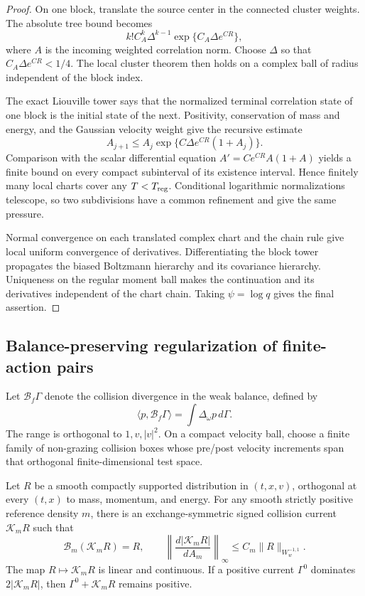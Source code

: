 \begin{proof}
On one block, translate the source center in the connected cluster weights.
The absolute tree bound becomes
\[
 k!C_A^k\Delta^{k-1}
 \exp\{C_A\Delta e^{CR}\},
\]
where \(A\) is the incoming weighted correlation norm.  Choose
\(\Delta\) so that \(C_A\Delta e^{CR}<1/4\).  The local cluster theorem then
holds on a complex ball of radius independent of the block index.

The exact Liouville tower says that the normalized terminal correlation state
of one block is the initial state of the next.  Positivity, conservation of
mass and energy, and the Gaussian velocity weight give the recursive estimate
\[
 A_{j+1}\le A_j\exp\{C\Delta e^{CR}(1+A_j)\}.
\]
Comparison with the scalar differential equation
\(A'=Ce^{CR}A(1+A)\) yields a finite bound on every compact subinterval of its
existence interval.  Hence finitely many local charts cover any
\(T<T_{\rm reg}\).  Conditional logarithmic normalizations telescope, so two
subdivisions have a common refinement and give the same pressure.

Normal convergence on each translated complex chart and the chain rule give
local uniform convergence of derivatives.  Differentiating the block tower
propagates the biased Boltzmann hierarchy and its covariance hierarchy.
Uniqueness on the regular moment ball makes the continuation and its
derivatives independent of the chart chain.  Taking
\(\psi=\log q\) gives the final assertion.
\end{proof}

\subsection{Balance-preserving regularization of finite-action pairs}

Let \(\mathscr B_f\Gamma\) denote the collision divergence in the weak
balance, defined by
\[
 \langle p,\mathscr B_f\Gamma\rangle
 =\int\Delta_\omega p\,d\Gamma.
\]
The range is orthogonal to \(1,v,|v|^2\).  On a compact velocity ball, choose
a finite family of non-grazing collision boxes whose pre/post velocity
increments span that orthogonal finite-dimensional test space.

\begin{lemma}
\label{lem:r3-b2-right-inverse}
Let \(R\) be a smooth compactly supported distribution in
\((t,x,v)\), orthogonal at every \((t,x)\) to mass, momentum, and energy.  For
any smooth strictly positive reference density \(m\), there is an
exchange-symmetric signed collision current \(\mathscr K_mR\) such that
\[
 \mathscr B_m(\mathscr K_mR)=R,
 \qquad
 \left\|\frac{d|\mathscr K_mR|}{dA_m}\right\|_\infty
 \le C_m\|R\|_{W^{-1,1}_w}.
\]
The map \(R\mapsto\mathscr K_mR\) is linear and continuous.  If a positive
current \(\Gamma^0\) dominates
\(2|\mathscr K_mR|\), then
\(\Gamma^0+\mathscr K_mR\) remains positive.
\end{lemma}


